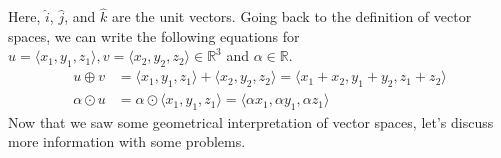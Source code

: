 \documentclass[../main.tex]{subfiles}
\begin{document}
Here, $\hat{i}$, $\hat{j}$, and $\hat{k}$ are the unit vectors.
Going back to the definition of vector spaces, we can write the
following equations for $u = \langle x_1, y_1, z_1 \rangle,
v = \langle x_2, y_2, z_2 \rangle \in \mathbb{R}^3$ and $\alpha
\in \mathbb{R}$.
\begin{align*}
    u \oplus v
    &= \langle x_1, y_1, z_1 \rangle + \langle x_2, y_2, z_2 \rangle
    = \langle x_1 + x_2, y_1 + y_2, z_1 + z_2 \rangle \\
    \alpha \odot u
    &= \alpha \odot \langle x_1, y_1, z_1 \rangle
    = \langle \alpha x_1, \alpha y_1, \alpha z_1 \rangle
\end{align*}
Now that we saw some geometrical interpretation of vector spaces,
let's discuss more information with some problems.
\end{document}
